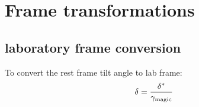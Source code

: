 \documentclass[11pt]{article}
\begin{document}
\section{Frame transformations}

\subsection{laboratory frame conversion}
%
To convert the rest frame tilt angle to lab frame:
\begin{equation}
\delta = \frac{\delta^{*}}{\gamma_{\text{magic}}} \\
\end{equation}

\end{document}
